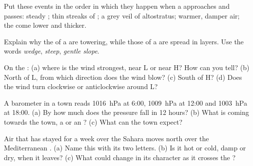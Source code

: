 \begin{exercise}[$\star\star$]\label{exo:g8:fronts-and-weather-maps:5}
Put these events in the order in which they happen when a 
approaches and passes: steady ; thin streaks of ; a grey veil
of altostratus; warmer, damper air; the  come lower and thicker.
\end{exercise}

\begin{exercise}[$\star\star$]\label{exo:g8:fronts-and-weather-maps:6}
Explain why the  of a  are towering, while those of a
 are spread in layers. Use the words \emph{wedge},
\emph{steep}, \emph{gentle slope}.
\end{exercise}

\begin{exercise}[$\star\star$]\label{exo:g8:fronts-and-weather-maps:7}
On the  : (a) where is the wind strongest, near L or near H?
How can you tell? (b) North of L, from which direction does the wind
blow? (c) South of H? (d) Does the wind turn clockwise or anticlockwise
around L?
\end{exercise}

\begin{exercise}[$\star\star$]\label{exo:g8:fronts-and-weather-maps:8}
A barometer in a town reads \qty{1016}{hPa} at 6:00, \qty{1009}{hPa} at
12:00 and \qty{1003}{hPa} at 18:00. (a) By how much does the pressure
fall in 12 hours? (b) What is coming towards the town, a  or an
? (c) What  can the town expect?
\end{exercise}

\begin{exercise}[$\star\star$]\label{exo:g8:fronts-and-weather-maps:9}
Air that has stayed for a week over the Sahara moves north over the
Mediterranean . (a) Name this  with its two letters. (b) Is it
hot or cold, damp or dry, when it leaves? (c) What could change in its
character as it crosses the ?
\end{exercise}

